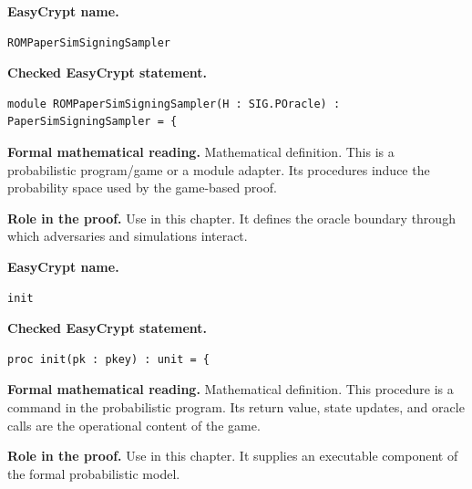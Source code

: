 \begin{formaldefinition}
\noindent\textbf{EasyCrypt name.}
\begin{lstlisting}[language=EasyCrypt,basicstyle=\ttfamily\scriptsize]
ROMPaperSimSigningSampler
\end{lstlisting}
\noindent\textbf{Checked EasyCrypt statement.}
\begin{lstlisting}[language=EasyCrypt,basicstyle=\ttfamily\scriptsize]
module ROMPaperSimSigningSampler(H : SIG.POracle) : PaperSimSigningSampler = {
\end{lstlisting}
\noindent\textbf{Formal mathematical reading.}
Mathematical definition. This is a probabilistic program/game or a module adapter.  Its procedures induce the probability space used by the game-based proof.

\noindent\textbf{Role in the proof.}
Use in this chapter. It defines the oracle boundary through which adversaries and simulations interact.

\end{formaldefinition}

\begin{formaldefinition}
\noindent\textbf{EasyCrypt name.}
\begin{lstlisting}[language=EasyCrypt,basicstyle=\ttfamily\scriptsize]
init
\end{lstlisting}
\noindent\textbf{Checked EasyCrypt statement.}
\begin{lstlisting}[language=EasyCrypt,basicstyle=\ttfamily\scriptsize]
proc init(pk : pkey) : unit = {
\end{lstlisting}
\noindent\textbf{Formal mathematical reading.}
Mathematical definition. This procedure is a command in the probabilistic program.  Its return value, state updates, and oracle calls are the operational content of the game.

\noindent\textbf{Role in the proof.}
Use in this chapter. It supplies an executable component of the formal probabilistic model.

\end{formaldefinition}

